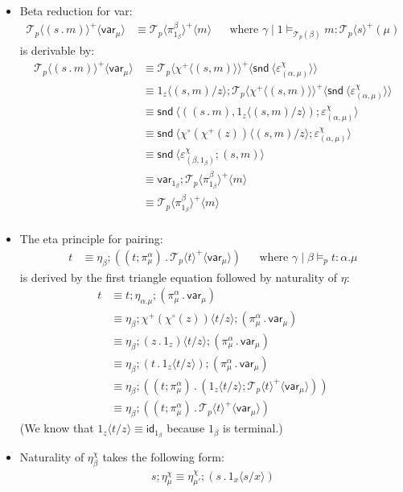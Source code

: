 \documentclass[10pt]{article}
\theoremstyle{definition}
\newcommand\dsd[1]{\ensuremath{\mathsf{#1}}}
\newcommand\TermTwoT[5]{\ensuremath{#1 \mid #3 \vDash_{#5} #2 : #4}}
\newcommand\TrPlus[2]{\ensuremath{{#1}^+(#2)}}
\newcommand\TrCirc[2]{\ensuremath{{#1}^\circ(#2)}}
\newcommand\var[1]{\ensuremath{\mathsf{var}_{#1}}}
\newcommand{\id}{\mathsf{id}}
\newcommand\El[2]{\mathcal{T}_{#1}(#2)}
\newcommand\ApEl[2]{\mathcal{T}_{#1}\langle#2\rangle}
\newcommand\ap[2]{\ensuremath{#1 \langle #2 \rangle }}
\newcommand{\app}[2]{\ensuremath{#1 \: #2}}
\newcommand{\snd}[1]{\app{\dsd{snd}}{#1}}
\newcommand\bdot[0]{\mathbin{.}}
\begin{document}
\begin{itemize}
\item Beta reduction for var:
\begin{align}
\label{beta-var}
\ap{\ApEl{p}{(s \bdot m)}^+}{\var{\mu}} &\equiv \ap{\ApEl{p}{\pi^\beta_{1_\beta}}^+}{m}  && \text{where } \TermTwoT{\gamma}{m}{1}{\ApEl{p}{s}^+(\mu)}{\El{p}{\beta}}
\end{align}
is derivable by:
\begin{align*}
\ap{\ApEl{p}{(s \bdot m)}^+}{\var{\mu}} 
&\equiv \ap{\ApEl{p}{\ap{\chi^+}{(s, m)}}^+}{\ap \snd {\varepsilon^\chi_{(\alpha, \mu)}}} \\
&\equiv \ap{1_z}{(s, m)/z};\ap{\ApEl{p}{\ap{\chi^+}{(s, m)}}^+}{\ap \snd {\varepsilon^\chi_{(\alpha, \mu)}}} \\
&\equiv \ap \snd {((s \bdot m), \ap{1_z}{(s, m)/z});\varepsilon^\chi_{(\alpha, \mu)}} \\
&\equiv \ap \snd {\ap{\TrCirc{\chi}{\TrPlus{\chi}{z}}}{(s, m)/z};\varepsilon^\chi_{(\alpha, \mu)}} \\
&\equiv \ap \snd {\varepsilon^\chi_{(\beta, 1_\beta)};(s, m)} \\
&\equiv \var{1_\beta}; \ap{\ApEl{p}{\pi^\beta_{1_\beta}}^+}{m} \\
&\equiv \ap{\ApEl{p}{\pi^\beta_{1_\beta}}^+}{m} \\
\end{align*}

\item The eta principle for pairing:
\begin{align}
\label{eta-pi-var}
t &\equiv \eta_\beta;((t;\pi^\alpha_\mu) \bdot \ap{\ApEl{p}{t}^+}{\var{\mu}}) && \text{where } \TermTwoT{\gamma}{t}{\beta}{\alpha.\mu}{p}
\end{align}
is derived by the first triangle equation followed by naturality of $\eta$:
\begin{align*}
t &\equiv t;\eta_{\alpha.\mu};(\pi_\mu^\alpha \bdot \var{\mu}) \\
&\equiv \eta_\beta;\ap{\TrPlus{\chi}{\TrCirc{\chi}{z}}}{t/z};(\pi_\mu^\alpha \bdot \var{\mu}) \\
&\equiv \eta_\beta;\ap{(z \bdot 1_z)}{t/z};(\pi_\mu^\alpha \bdot \var{\mu}) \\
&\equiv \eta_\beta;(t \bdot \ap{1_z}{t/z});(\pi_\mu^\alpha \bdot \var{\mu}) \\
&\equiv \eta_\beta;((t;\pi_\mu^\alpha) \bdot (\ap{1_z}{t/z}; \ap{\ApEl{p}{t}^+}{\var{\mu}})) \\
&\equiv \eta_\beta;((t;\pi_\mu^\alpha) \bdot \ap{\ApEl{p}{t}^+}{\var{\mu}})
\end{align*}
(We know that $\ap{1_z}{t/z} \equiv \id_{1_\beta}$ because $1_\beta$ is terminal.)
\item Naturality of $\eta^\chi_\beta$ takes the following form:
\begin{align*}
s;\eta^\chi_\mu \equiv \eta^\chi_{\mu'} ; (s \bdot \ap{1_x}{s/x})
\end{align*}
\end{itemize}
\end{document}
